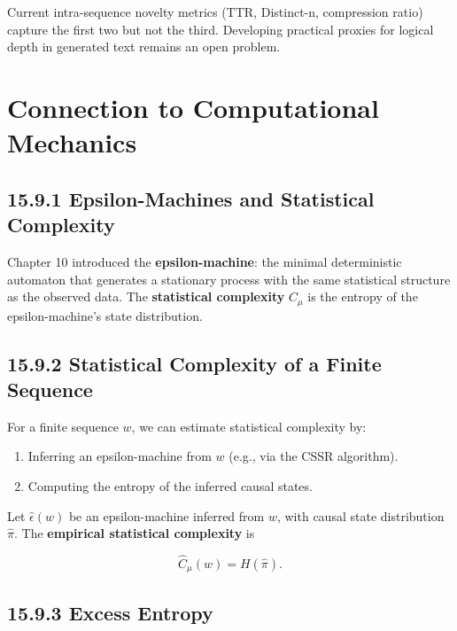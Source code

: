 Current intra-sequence novelty metrics (TTR, Distinct-n, compression ratio) capture the first two but not the third. Developing practical proxies for logical depth in generated text remains an open problem.



\section{Connection to Computational Mechanics}

\subsection{15.9.1 Epsilon-Machines and Statistical Complexity}

Chapter 10 introduced the \textbf{epsilon-machine}: the minimal deterministic automaton that generates a stationary process with the same statistical structure as the observed data. The \textbf{statistical complexity} $C_\mu$ is the entropy of the epsilon-machine's state distribution.

\subsection{15.9.2 Statistical Complexity of a Finite Sequence}

For a finite sequence $w$, we can estimate statistical complexity by:

\begin{enumerate}
\item Inferring an epsilon-machine from $w$ (e.g., via the CSSR algorithm).
\item Computing the entropy of the inferred causal states.
\end{enumerate}

\begin{definition}
Let $\hat{\epsilon}(w)$ be an epsilon-machine inferred from $w$, with causal state distribution $\hat{\pi}$. The \textbf{empirical statistical complexity} is

\[\hat{C}_\mu(w) = H(\hat{\pi}).\]
\end{definition}

\subsection{15.9.3 Excess Entropy}


